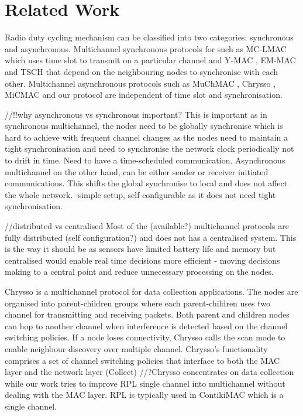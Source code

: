 \section{Related Work}

Radio duty cycling mechanism can be classified into two categories; synchronous and asynchronous. Multichannel synchronous protocols for such as MC-LMAC \cite{mc-lmac} which uses time slot to transmit on a particular channel and Y-MAC \cite{y-mac}, EM-MAC \cite{emmac} and TSCH that depend on the neighbouring nodes to synchronise with each other. Multichannel asynchronous protocols such as MuChMAC \cite{muchmac}, Chrysso \cite{chrysso}, MiCMAC \cite{micmac} and our protocol are independent of time slot and synchronisation. 

//!!why asynchronous vs synchronous important?
This is important as in synchronous multichannel, the nodes need to be globally synchronise which is hard to achieve with frequent channel changes as the nodes need to maintain a tight synchronisation and need to synchronise the network clock periodically not to drift in time. Need to have a time-scheduled communication. Asynchronous multichannel on the other hand, can be either sender or receiver initiated communications. This shifts the global synchronise to local and does not affect the whole network.
-simple setup, self-configurable as it does not need tight synchronisation.

//distributed vs centralised
Most of the (available?) multichannel protocols are fully distributed (self configuration?) and does not has a centralised system. This is the way it should be as sensors have limited battery life and memory but centralised would enable real time decisions more efficient - moving decisions making to a central point and reduce unnecessary processing on the nodes.

Chrysso \cite{chrysso} is a multichannel protocol for data collection applications. The nodes are organised into parent-children groups where each parent-children uses two channel for transmitting and receiving packets. Both parent and children nodes can hop to another channel when interference is detected based on the channel switching policies. If a node loses connectivity, Chrysso calls the scan mode to enable neighbour discovery over multiple channel. Chrysso’s functionality comprises a set of channel switching policies that interface to both the MAC layer and the network layer (Collect)
//?Chrysso concentrates on data collection while our work tries to improve RPL single channel into multichannel without dealing with the MAC layer. RPL is typically used in ContikiMAC which is a single channel.

